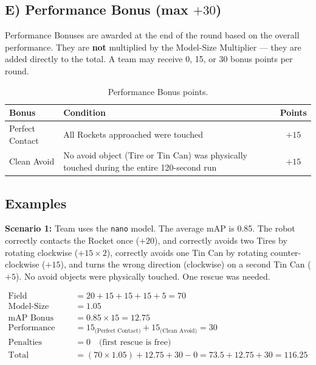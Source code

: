 \documentclass[a4]{article}
\begin{document}
\subsection*{E) Performance Bonus (max $+30$)}

Performance Bonuses are awarded at the end of the round based on the overall performance. They are \textbf{not} multiplied by the Model-Size Multiplier --- they are added directly to the total. A team may receive 0, 15, or 30 bonus points per round.

\begin{table}[H]
\centering
\begin{tabular}{p{4cm}p{7cm}c}
\toprule
\textbf{Bonus} & \textbf{Condition} & \textbf{Points} \\
\midrule
Perfect Contact & All Rockets approached were touched & $+15$ \\
Clean Avoid & No avoid object (Tire or Tin Can) was physically touched during the entire 120-second run & $+15$ \\
\bottomrule
\end{tabular}
\caption{Performance Bonus points.}
\end{table}

\subsection*{Examples}

\textbf{Scenario 1:} Team uses the \texttt{nano} model. The average mAP is 0.85. The robot correctly contacts the Rocket once ($+20$), and correctly avoids two Tires by rotating clockwise ($+15 \times 2$), correctly avoids one Tin Can by rotating counter-clockwise ($+15$), and turns the wrong direction (clockwise) on a second Tin Can ($+5$). No avoid objects were physically touched. One rescue was needed.

\begin{align*}
\text{Field Performance} &= 20 + 15 + 15 + 15 + 5 = 70 \\
\text{Model-Size Multiplier} &= 1.05 \\
\text{mAP Bonus} &= 0.85 \times 15 = 12.75 \\
\text{Performance Bonus} &= 15_{\text{(Perfect Contact)}} + 15_{\text{(Clean Avoid)}} = 30 \\
\text{Penalties} &= 0 \quad \text{(first rescue is free)} \\
\text{Total} &= (70 \times 1.05) + 12.75 + 30 - 0 = 73.5 + 12.75 + 30 = \mathbf{116.25}
\end{align*}
\end{document}
